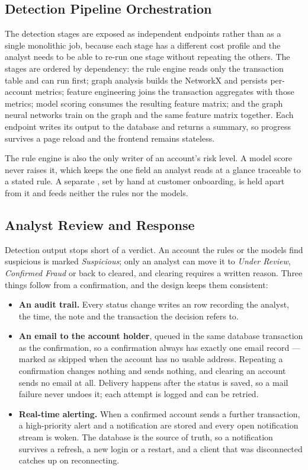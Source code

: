 \subsection{Detection Pipeline Orchestration}
The detection stages are exposed as independent endpoints rather than as a single monolithic job, because each stage has a different cost profile and the analyst needs to be able to re-run one stage without repeating the others. The stages are ordered by dependency: the rule engine reads only the transaction table and can run first; graph analysis builds the NetworkX  and persists per-account metrics; feature engineering joins the transaction aggregates with those metrics; model scoring consumes the resulting feature matrix; and the graph neural networks train on the graph and the same feature matrix together. Each endpoint writes its output to the database and returns a summary, so progress survives a page reload and the frontend remains stateless.

The rule engine is also the only writer of an account's risk level. A model score never raises it, which keeps the one field an analyst reads at a glance traceable to a stated rule. A separate , set by hand at customer onboarding, is held apart from it and feeds neither the rules nor the models.

\subsection{Analyst Review and Response}\label{sec:review}
Detection output stops short of a verdict. An account the rules or the models find suspicious is marked \textit{Suspicious}; only an analyst can move it to \textit{Under Review}, \textit{Confirmed Fraud} or back to cleared, and clearing requires a written reason. Three things follow from a confirmation, and the design keeps them consistent:

\begin{itemize}
  \item \textbf{An audit trail.} Every status change writes an  row recording the analyst, the time, the note and the transaction the decision refers to.
  \item \textbf{An email to the account holder}, queued in the same database transaction as the confirmation, so a confirmation always has exactly one email record --- marked as skipped when the account has no usable address. Repeating a confirmation changes nothing and sends nothing, and clearing an account sends no email at all. Delivery happens after the status is saved, so a mail failure never undoes it; each attempt is logged and can be retried.
  \item \textbf{Real-time alerting.} When a confirmed account sends a further transaction, a high-priority alert and a notification are stored and every open notification stream is woken. The database is the source of truth, so a notification survives a refresh, a new login or a restart, and a client that was disconnected catches up on reconnecting.
\end{itemize}

